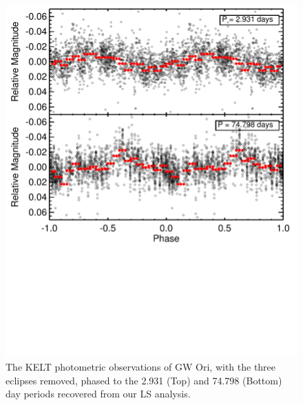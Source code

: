 \documentclass[twocolumn]{aastex61}
\begin{document}
\begin{figure}[!ht]
\centering\includegraphics[width=0.99\linewidth, trim = 0 3.5in 0 0]{Figure_Phased.pdf}
\caption{The KELT photometric observations of GW Ori, with the three eclipses removed, phased to the 2.931 (Top) and 74.798 (Bottom) day periods recovered from our LS analysis. }%
\label{figure:phased}
\end{figure}
\end{document}
